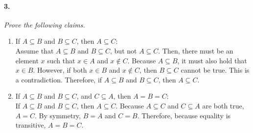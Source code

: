 \documentclass[12pt]{article}
\begin{document}
\pagebreak

\paragraph{3.}
\textit{Prove the following claims.}
\begin{enumerate}[label=\textbf{\alph*.}]
    \item If $A \subseteq B$ and $B \subseteq C$, then $A \subseteq C$: \\
    Assume that $A \subseteq B$ and $B \subseteq C$, but not $A \subseteq C$. Then, there must be
    an element $x$ such that $x \in A$ and $x \notin C$. Because $A \subseteq B$, it must also hold
    that $x \in B$. However, if both $x \in B$ and $x \notin C$, then $B \subseteq C$ cannot be
    true. This is a contradiction. Therefore, if $A \subseteq B$ and $B \subseteq C$, then
    $A \subseteq C$.
    \item If $A \subseteq B$ and $B \subseteq C$, and $C \subseteq A$, then $A = B = C$: \\
    If $A \subseteq B$ and $B \subseteq C$, then $A \subseteq C$. Because $A \subseteq C$ and
    $C \subseteq A$ are both true, $A = C$. By symmetry, $B = A$ and $C = B$. Therefore, because
    equality is transitive, $A = B = C$.
\end{enumerate}
\end{document}

